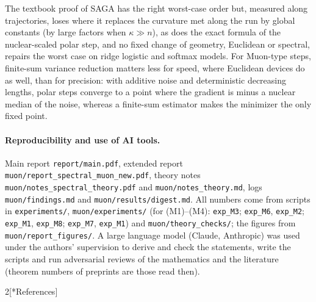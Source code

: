 \documentclass[10pt]{article}
\makeatletter
\renewcommand\section{\@startsection{section}{1}{\z@}{-2.4ex \@plus -0.6ex \@minus -.2ex}{1.2ex \@plus .2ex}{\normalfont\large\bfseries}}
\renewcommand\subsection{\@startsection{subsection}{2}{\z@}{-1.8ex\@plus -0.5ex \@minus -.2ex}{0.8ex \@plus .2ex}{\normalfont\normalsize\bfseries}}
\theoremstyle{remark}
\makeatother
\begin{document}
\subsection{Conclusion}

The textbook proof of SAGA has the right worst-case order but, measured along trajectories, loses where it replaces the
curvature met along the run by global constants (by large factors when $\kappa\gg n$), as does the exact formula of the nuclear-scaled polar step, and no
fixed change of geometry, Euclidean or spectral, repairs the worst case on ridge logistic and softmax models. For
Muon-type steps, finite-sum variance reduction matters less for speed, where Euclidean devices do as well,
than for precision: with additive noise and deterministic decreasing lengths, polar steps converge to a point where the
gradient is minus a nuclear median of the noise, whereas a finite-sum estimator makes the minimizer the only fixed
point.

\paragraph{Reproducibility and use of AI tools.} Main report \nolinkurl{report/main.pdf}, extended report
\nolinkurl{muon/report_spectral_muon_new.pdf}, theory notes \nolinkurl{muon/notes_spectral_theory.pdf} and
\nolinkurl{muon/notes_theory.md}, logs \nolinkurl{muon/findings.md} and \nolinkurl{muon/results/digest.md}.
All numbers come from scripts in \nolinkurl{experiments/}, \nolinkurl{muon/experiments/} (for (M1)--(M4):
\texttt{exp\_M3}; \texttt{exp\_M6}, \texttt{exp\_M2}; \texttt{exp\_M1}, \texttt{exp\_M8}; \texttt{exp\_M7}, \texttt{exp\_M1}) and
\nolinkurl{muon/theory_checks/}; the figures from \nolinkurl{muon/report_figures/}. A
large language model (Claude, Anthropic) was used under the authors' supervision to derive and check the statements,
write the scripts and run adversarial reviews of the mathematics and the literature (theorem numbers of preprints are
those read then).

{\footnotesize\setlength{\columnsep}{1.6em}
\begin{multicols}{2}[\section*{References}]
\sloppy


\end{multicols}
}
\end{document}
